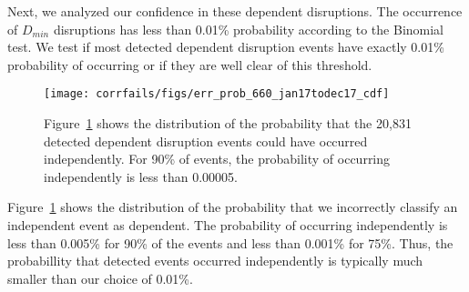 Next, we analyzed our confidence in these dependent
disruptions. The occurrence of $D_{min}$ disruptions has less than 0.01\%
probability according to the Binomial test. We test if most detected
dependent disruption events have exactly 0.01\%
probability of occurring or if they are well clear of this threshold.

\begin{figure}[t]
  \centering
  \texttt{[image: corrfails/figs/err\_prob\_660\_jan17todec17\_cdf]} 
\caption[Distribution of the probability that detected dependent
disruption events could have occurred independently]{
   \label{fig:err_prob}
Figure~\ref{fig:err_prob} shows the distribution of the
probability that the 20,831 detected dependent disruption events could have occurred
independently. For 90\% of events, the probability of occurring
independently is less than 0.00005.
 }
\end{figure} 

Figure~\ref{fig:err_prob} shows the distribution of the probability that
we incorrectly classify an independent event as dependent. The probability of occurring
independently is less than 0.005\% for 90\% of the events and less
than 0.001\% for 75\%. Thus, the probabillity that detected events
occurred independently is typically much smaller than our choice of
0.01\%.

